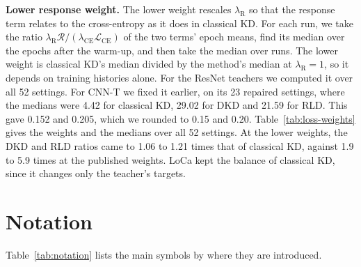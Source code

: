 \documentclass[review,number,sort&compress]{elsarticle}
\theoremstyle{definition}
\begin{document}
\textbf{Lower response weight.} The lower weight rescales
$\lambda_{\mathrm R}$ so that the response term relates to the
cross-entropy as it does in classical KD. For each run, we take the
ratio $\lambda_{\mathrm R}\mathcal R/(\lambda_{\mathrm{CE}}\mathcal
L_{\mathrm{CE}})$ of the two terms' epoch means, find its median over
the epochs after the warm-up, and then take the median over runs. The
lower weight is classical KD's median divided by the method's median at
$\lambda_{\mathrm R}=1$, so it depends on training histories alone. For
the ResNet teachers we computed it over all 52 settings. For CNN-T we
fixed it earlier, on its 23 repaired settings, where the medians were
4.42 for classical KD, 29.02 for DKD and 21.59 for RLD. This gave 0.152
and 0.205, which we rounded to 0.15 and 0.20.
Table~\ref{tab:loss-weights} gives the weights and the medians over all
52 settings. At the lower weights, the DKD and RLD ratios came to 1.06
to 1.21 times that of classical KD, against 1.9 to 5.9 times at the
published weights. LoCa kept the balance of classical KD, since it
changes only the teacher's targets.

\FloatBarrier
\section{Notation}
\label{app:notation}

Table~\ref{tab:notation} lists the main symbols by where they are
introduced.
\end{document}
